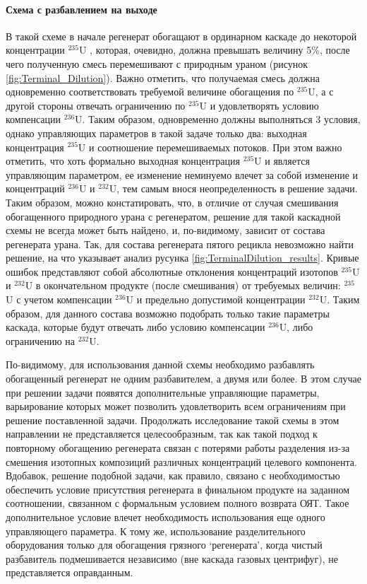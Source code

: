 \paragraph{Схема с разбавлением на выходе}
В такой схеме в начале регенерат обогащают в ординарном каскаде до некоторой концентрации $^{235}$U , которая, очевидно, должна превышать величину 5\%, после чего полученную смесь перемешивают с природным ураном (рисунок \ref{fig:Terminal_Dilution}). Важно отметить, что получаемая смесь должна одновременно соответствовать требуемой величине обогащения по $^{235}$U, а с другой стороны отвечать ограничению по $^{235}$U и удовлетворять условию компенсации $^{236}$U. Таким образом, одновременно должны выполняться 3 условия, однако управляющих параметров в такой задаче только два: выходная концентрация $^{235}$U и соотношение перемешиваемых потоков. При этом важно отметить, что хоть формально выходная концентрация  $^{235}$U и является управляющим параметром, ее изменение неминуемо влечет за собой изменение и
концентраций $^{236}$U и $^{232}$U, тем самым внося неопределенность в решение задачи. Таким
образом, можно констатировать, что, в отличие от случая смешивания обогащенного
природного урана с регенератом, решение для такой каскадной схемы не всегда может
быть найдено, и, по-видимому, зависит от состава регенерата урана.
Так, для состава регенерата пятого рецикла невозможно найти решение, на что указывает анализ русунка \ref{fig:TerminalDilution_results}. Кривые ошибок представляют собой абсолютные отклонения концентраций изотопов $^{235}$U и $^{232}$U в окончательном продукте (после смешивания) от требуемых величин: $^{235}$U с учетом компенсации $^{236}$U и предельно допустимой концентрации $^{232}$U. Таким образом, для данного состава возможно
подобрать только такие параметры каскада, которые будут отвечать либо условию
компенсации  $^{236}$U, либо ограничению на $^{232}$U.

По-видимому, для использования данной схемы необходимо разбавлять обогащенный регенерат не одним разбавителем, а двумя или более. В этом случае при решении задачи появятся дополнительные управляющие параметры, варьирование которых может позволить удовлетворить всем ограничениям
при решение поставленной задачи. Продолжать исследование такой схемы в этом направлении не представляется целесообразным, так как такой подход к повторному обогащению регенерата связан с потерями работы разделения из-за смешения изотопных композиций различных концентраций целевого компонента. Вдобавок, решение подобной задачи, как правило, связано с необходимостью обеспечить условие присутствия регенерата в финальном продукте на заданном соотношении, связанном с формальным условием полного возврата ОЯТ. Такое дополнительное условие влечет необходимость использования еще одного управляющего параметра. К тому же, использование разделительного оборудования только для обогащения грязного `регенерата', когда чистый разбавитель подмешивается независимо (вне каскада газовых центрифуг), не представляется оправданным.

